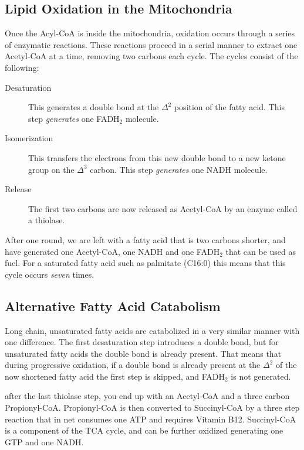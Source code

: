 \documentclass{tufte-handout}
\begin{document}
\subsection{Lipid Oxidation in the Mitochondria}

Once the Acyl-CoA is inside the mitochondria, oxidation occurs through a series of enzymatic reactions.  These reactions proceed in a serial manner to extract one Acetyl-CoA at a time, removing two carbons each cycle.  The cycles consist of the following:

\begin{description}
\item [Desaturation] This generates a double bond at the $\Delta^2$ position of the fatty acid.  This step \emph{generates} one FADH$_2$ molecule.
\item [Isomerization] This transfers the electrons from this new double bond to a new ketone group on the  $\Delta^3$ carbon.  This step \emph{generates} one NADH molecule.
\item [Release] The first two carbons are now released as Acetyl-CoA by an enzyme called a thiolase.
\end{description} 

After one round, we are left with a fatty acid that is two carbons shorter, and have generated one Acetyl-CoA, one NADH and one FADH$_2$ that can be used as fuel.  For a saturated fatty acid such as palmitate (C16:0) this means that this cycle occurs \emph{seven} times.

\subsection{Alternative Fatty Acid Catabolism}

Long chain, unsaturated fatty acids are catabolized in a very similar manner with one difference.  The first desaturation step introduces a double bond, but for unsaturated fatty acids the double bond is already present.  That means that during progressive oxidation, if a double bond is already present at the $\Delta^2$ of the now shortened fatty acid the first step is skipped, and FADH$_2$ is not generated.

 after the last thiolase step, you end up with an Acetyl-CoA and a three carbon Propionyl-CoA.  Propionyl-CoA is then converted to Succinyl-CoA by a three step reaction that in net consumes one ATP and requires Vitamin B12.  Succinyl-CoA is a component of the TCA cycle, and can be further oxidized generating one GTP and one NADH.  
\end{document}
